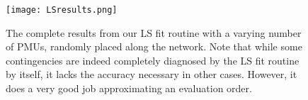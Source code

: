\begin{figure}[h!]
    \centering
    \texttt{[image: LSresults.png]}
    \caption{The complete results from our LS fit routine with a varying number of PMUs, randomly placed along the network. Note that while some contingencies are indeed completely diagnosed by the LS fit routine by itself, it lacks the accuracy necessary in other cases. However, it does a very good job approximating an evaluation order.}
\end{figure}






